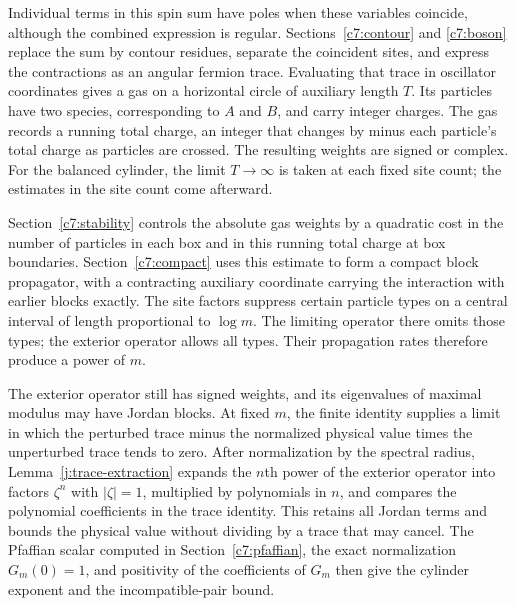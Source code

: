 Individual terms in this spin sum have poles when these variables
coincide, although the combined expression is regular.
Sections~\ref{c7:contour} and \ref{c7:boson} replace the sum by contour
residues, separate the coincident sites, and express the contractions
as an angular fermion trace. Evaluating that trace in oscillator
coordinates gives a gas on a horizontal circle of auxiliary length
$T$. Its particles have two species, corresponding to $A$ and $B$,
and carry integer charges. The gas records a running total charge, an
integer that changes by minus each particle's total charge as particles are
crossed. The resulting weights are signed or complex.
For the balanced cylinder, the limit $T\to\infty$ is taken at each fixed
site count; the estimates in the site count come afterward.

Section~\ref{c7:stability} controls the absolute gas weights by a
quadratic cost in the number of particles in each box and in this
running total charge at box boundaries. Section~\ref{c7:compact} uses
this estimate to form a
compact block propagator, with a contracting auxiliary coordinate
carrying the interaction with earlier blocks exactly. The site factors
suppress certain particle types on a central interval of length
proportional to $\log m$. The limiting operator there omits those types;
the exterior operator allows all types. Their propagation rates therefore
produce a power of $m$.

The exterior operator still has signed weights, and its eigenvalues of
maximal modulus may have Jordan blocks. At fixed $m$, the finite identity
supplies a limit in which the perturbed trace minus the normalized
physical value times the unperturbed trace tends to zero.
After normalization by the spectral radius,
Lemma~\ref{j:trace-extraction} expands the $n$th power of the exterior operator into
factors $\zeta^n$ with $|\zeta|=1$, multiplied by polynomials in $n$,
and compares the polynomial coefficients in the trace identity. This
retains all Jordan terms and bounds the
physical value without dividing by a trace that may cancel.
The Pfaffian scalar computed in Section~\ref{c7:pfaffian}, the exact
normalization $G_m(0)=1$, and positivity of the coefficients of $G_m$
then give the cylinder exponent and the incompatible-pair bound.

